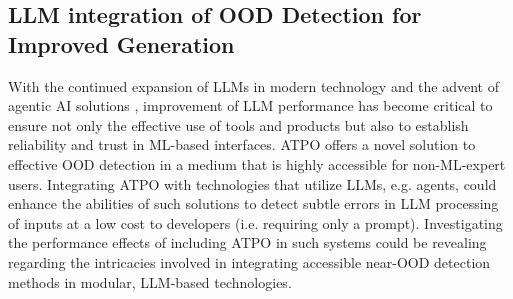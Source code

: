 \subsection{LLM integration of OOD Detection for Improved Generation}
\label{sec:future_work-llm}

With the continued expansion of LLMs in modern technology and the advent of agentic AI solutions \cite{yuksel2025multi}, improvement of LLM performance has become critical to ensure not only the effective use of tools and products but also to establish reliability and trust in ML-based interfaces. ATPO offers a novel solution to effective OOD detection in a medium that is highly accessible for non-ML-expert users. Integrating ATPO with technologies that utilize LLMs, e.g. agents, could enhance the abilities of such solutions to detect subtle errors in LLM processing of inputs at a low cost to developers (i.e. requiring only a prompt). Investigating the performance effects of including ATPO in such systems could be revealing regarding the intricacies involved in integrating accessible near-OOD detection methods in modular, LLM-based technologies.
